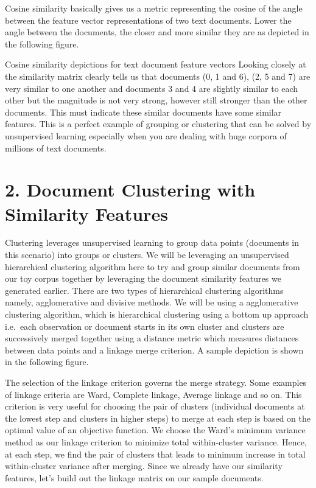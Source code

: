 \documentclass[11pt]{article}
\begin{document}
    Cosine similarity basically gives us a metric representing the cosine of
the angle between the feature vector representations of two text
documents. Lower the angle between the documents, the closer and more
similar they are as depicted in the following figure.

Cosine similarity depictions for text document feature vectors Looking
closely at the similarity matrix clearly tells us that documents (0, 1
and 6), (2, 5 and 7) are very similar to one another and documents 3 and
4 are slightly similar to each other but the magnitude is not very
strong, however still stronger than the other documents. This must
indicate these similar documents have some similar features. This is a
perfect example of grouping or clustering that can be solved by
unsupervised learning especially when you are dealing with huge corpora
of millions of text documents.

    \hypertarget{document-clustering-with-similarity-features}{%
\section{2. Document Clustering with Similarity
Features}\label{document-clustering-with-similarity-features}}

    Clustering leverages unsupervised learning to group data points
(documents in this scenario) into groups or clusters. We will be
leveraging an unsupervised hierarchical clustering algorithm here to try
and group similar documents from our toy corpus together by leveraging
the document similarity features we generated earlier. There are two
types of hierarchical clustering algorithms namely, agglomerative and
divisive methods. We will be using a agglomerative clustering algorithm,
which is hierarchical clustering using a bottom up approach i.e.~each
observation or document starts in its own cluster and clusters are
successively merged together using a distance metric which measures
distances between data points and a linkage merge criterion. A sample
depiction is shown in the following figure.

The selection of the linkage criterion governs the merge strategy. Some
examples of linkage criteria are Ward, Complete linkage, Average linkage
and so on. This criterion is very useful for choosing the pair of
clusters (individual documents at the lowest step and clusters in higher
steps) to merge at each step is based on the optimal value of an
objective function. We choose the Ward's minimum variance method as our
linkage criterion to minimize total within-cluster variance. Hence, at
each step, we find the pair of clusters that leads to minimum increase
in total within-cluster variance after merging. Since we already have
our similarity features, let's build out the linkage matrix on our
sample documents.
\end{document}
